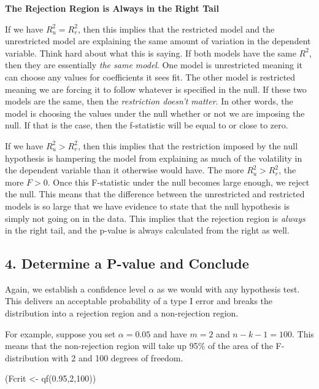 \documentclass[
]{book}
\newenvironment{Shaded}{\begin{snugshade}}{\end{snugshade}}
\newcommand{\DecValTok}[1]{\textcolor[rgb]{0.00,0.00,0.81}{#1}}
\newcommand{\FloatTok}[1]{\textcolor[rgb]{0.00,0.00,0.81}{#1}}
\newcommand{\FunctionTok}[1]{\textcolor[rgb]{0.00,0.00,0.00}{#1}}
\newcommand{\NormalTok}[1]{#1}
\newcommand{\OtherTok}[1]{\textcolor[rgb]{0.56,0.35,0.01}{#1}}
\begin{document}
\textbf{The Rejection Region is Always in the Right Tail}

If we have \(R^2_u = R^2_r\), then this implies that the restricted model and the unrestricted model are explaining the same amount of variation in the dependent variable. Think hard about what this is saying. If both models have the same \(R^2\), then they are essentially \emph{the same model}. One model is unrestricted meaning it can choose any values for coefficients it sees fit. The other model is restricted meaning we are forcing it to follow whatever is specified in the null. If these two models are the same, then the \emph{restriction doesn't matter}. In other words, the model is choosing the values under the null whether or not we are imposing the null. If that is the case, then the f-statistic will be equal to or close to zero.

If we have \(R^2_u > R^2_r\), then this implies that the restriction imposed by the null hypothesis is hampering the model from explaining as much of the volatility in the dependent variable than it otherwise would have. The more \(R^2_u > R^2_r\), the more \(F>0\). Once this F-statistic under the null becomes large enough, we reject the null. This means that the difference between the unrestricted and restricted models is so large that we have evidence to state that the null hypothesis is simply not going on in the data. This implies that the rejection region is \emph{always} in the right tail, and the p-value is always calculated from the right as well.

\hypertarget{determine-a-p-value-and-conclude}{%
\subsection*{4. Determine a P-value and Conclude}\label{determine-a-p-value-and-conclude}}

Again, we establish a confidence level \(\alpha\) as we would with any hypothesis test. This delivers an acceptable probability of a type I error and breaks the distribution into a rejection region and a non-rejection region.

For example, suppose you set \(\alpha = 0.05\) and have \(m=2\) and \(n-k-1 = 100\). This means that the non-rejection region will take up 95\% of the area of the F-distribution with 2 and 100 degrees of freedom.

\begin{Shaded}
\begin{Highlighting}[]
\NormalTok{(Fcrit }\OtherTok{\textless{}{-}} \FunctionTok{qf}\NormalTok{(}\FloatTok{0.95}\NormalTok{,}\DecValTok{2}\NormalTok{,}\DecValTok{100}\NormalTok{))}
\end{Highlighting}
\end{Shaded}
\end{document}
